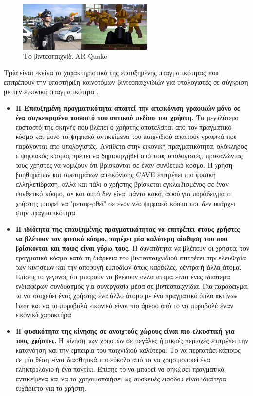\begin{figure}[H]
    \centering
    \includegraphics[width=0.6\textwidth]{Files/Figures/arquake.jpg}
    \caption[Το βιντεοπαιχνίδι AR-Quake]{Το βιντεοπαιχνίδι AR-Quake}
    \label{fig:hud}
\end{figure}



Τρία είναι εκείνα τα χαρακτηριστικά της επαυξημένης πραγματικότητας που επιτρέπουν την υποστήριξη καινοτόμων βιντεοπαιχνιδιών για υπολογιστές σε σύγκριση με την εικονική πραγματικότητα \cite{Thomas2012}.



\begin{itemize}
\item \textbf{Η Επαυξημένη πραγματικότητα απαιτεί την απεικόνιση γραφικών μόνο σε ένα συγκεκριμένο ποσοστό του οπτικού πεδίου του χρήστη.} Το μεγαλύτερο ποστοστό της σκηνής που βλέπει ο χρήστης αποτελείται από τον πραγματικό κόσμο και μονο τα ψηφιακά αντικείμενα του παιχνιδιού απαιτούν γραφικά που παράγονται από υπολογιστές. Αντίθετα στην εικονική πραγματικότητα, ολόκληρος ο ψηφιακός κόσμος πρέπει να δημιουργηθεί από τους υπολογιστές, προκαλώντας τους χρήστες να νομίζουν ότι βρίσκονται σε έναν συνθετικό κόσμο. Η χρήση βοηθημάτων και συστημάτων απεικόνισης CAVE επιτρέπει πιο φυσική αλληλεπίδραση, αλλά και πάλι ο χρήστης βρίσκεται εγκλωβισμένος σε έναν συνθετικό κόσμο, αν και αυτό δεν είναι πάντα κακό, αφού για παράδειγμα ο χρήστης μπορεί να "μεταφερθεί" σε έναν νέο ψηφιακό κόσμο που δεν υπάρχει στην πραγματικότητα.
  
\item \textbf{Η ιδιότητα της επαυξημένης πραγματικότητας να επιτρέπει στους χρήστες να βλέπουν τον φυσικό κόσμο, παρέχει μία καλύτερη αίσθηση του που βρίσκονται και ποιος είναι γύρω τους.} H δυνατότητα να βλέπουν οι χρήστες τον πραγματικό κόσμο κατά τη διάρκεια του βιντεοπαιχνιδιού επιτρέπει την ελευθερία των κινήσεων και την αποφυγή εμποδίων όπως καρέκλες, δέντρα ή άλλα άτομα. Επίσης το γεγονός ότι μπορούν να βλέπουν άλλα άτομα είναι ένας ιδιαίτερα ενδιαφέρων συνδυασμός για συνεργασία μέσα σε βιντεοπαιχνίδια. Για παράδειγμα, το να στοχεύει ένας χρήστης ένα άλλο άτομο με ένα πραγματικό όπλο ακτίνων laser και να το πυροβολά εικονικά είναι πιο άμεσο από το να πυροβολά έναν εικονικό χαρακτήρα. 
  
\item \textbf{Η φυσικότητα της κίνησης σε ανοιχτούς χώρους είναι πιο ελκυστική για τους χρήστες.} Η κίνηση των χρηστών σε μεγάλες ή μικρές περιοχές επιτρέπει την κατανόηση και την εμπειρία του παιχνιδιού καλύτερα. Το να περπατάει κάποιος σε μία θέση είναι διασθητικά πιο εύκολο από το να χρησιμοποιεί ένα πληκτρολόγιο ή ένα ποντίκι. Επίσης το να μπορεί να σηκώσει πραγματικά αντικείμενα και να τα χρησιμοποιήσει ως συσκευές εισόδου είναι ιδιαίτερα ευχάριστο για το χρήστη.
\end{itemize}

